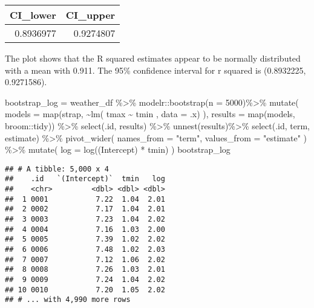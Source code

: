 \documentclass[
]{article}
\newenvironment{Shaded}{\begin{snugshade}}{\end{snugshade}}
\newcommand{\AttributeTok}[1]{\textcolor[rgb]{0.77,0.63,0.00}{#1}}
\newcommand{\DecValTok}[1]{\textcolor[rgb]{0.00,0.00,0.81}{#1}}
\newcommand{\FunctionTok}[1]{\textcolor[rgb]{0.00,0.00,0.00}{#1}}
\newcommand{\NormalTok}[1]{#1}
\newcommand{\OtherTok}[1]{\textcolor[rgb]{0.56,0.35,0.01}{#1}}
\newcommand{\SpecialCharTok}[1]{\textcolor[rgb]{0.00,0.00,0.00}{#1}}
\newcommand{\StringTok}[1]{\textcolor[rgb]{0.31,0.60,0.02}{#1}}
\begin{document}
\begin{longtable}[]{@{}rr@{}}
\toprule
CI\_lower & CI\_upper \\
\midrule
\endhead
0.8936977 & 0.9274807 \\
\bottomrule
\end{longtable}

The plot shows that the R squared estimates appear to be normally
distributed with a mean with 0.911. The 95\% confidence interval for r
squared is (0.8932225, 0.9271586).

\begin{Shaded}
\begin{Highlighting}[]
\NormalTok{bootstrap\_log }\OtherTok{=}
\NormalTok{  weather\_df }\SpecialCharTok{\%\textgreater{}\%} 
\NormalTok{  modelr}\SpecialCharTok{::}\FunctionTok{bootstrap}\NormalTok{(}\AttributeTok{n =} \DecValTok{5000}\NormalTok{)}\SpecialCharTok{\%\textgreater{}\%} 
  \FunctionTok{mutate}\NormalTok{(}
    \AttributeTok{models =} \FunctionTok{map}\NormalTok{(strap, }\SpecialCharTok{\textasciitilde{}}\FunctionTok{lm}\NormalTok{( tmax }\SpecialCharTok{\textasciitilde{}}\NormalTok{ tmin , }\AttributeTok{data =}\NormalTok{ .x) ),}
    \AttributeTok{results =} \FunctionTok{map}\NormalTok{(models, broom}\SpecialCharTok{::}\NormalTok{tidy)) }\SpecialCharTok{\%\textgreater{}\%} 
  \FunctionTok{select}\NormalTok{(.id, results) }\SpecialCharTok{\%\textgreater{}\%} 
  \FunctionTok{unnest}\NormalTok{(results)}\SpecialCharTok{\%\textgreater{}\%} 
  \FunctionTok{select}\NormalTok{(.id, term, estimate) }\SpecialCharTok{\%\textgreater{}\%} 
  \FunctionTok{pivot\_wider}\NormalTok{(}
    \AttributeTok{names\_from =} \StringTok{"term"}\NormalTok{,}
    \AttributeTok{values\_from =} \StringTok{"estimate"}
\NormalTok{  ) }\SpecialCharTok{\%\textgreater{}\%} 
  \FunctionTok{mutate}\NormalTok{(}
    \AttributeTok{log =} \FunctionTok{log}\NormalTok{(}\StringTok{\textasciigrave{}}\AttributeTok{(Intercept)}\StringTok{\textasciigrave{}} \SpecialCharTok{*}\NormalTok{ tmin)}
\NormalTok{  ) }
\NormalTok{bootstrap\_log}
\end{Highlighting}
\end{Shaded}

\begin{verbatim}
## # A tibble: 5,000 x 4
##    .id   `(Intercept)`  tmin   log
##    <chr>         <dbl> <dbl> <dbl>
##  1 0001           7.22  1.04  2.01
##  2 0002           7.17  1.04  2.01
##  3 0003           7.23  1.04  2.02
##  4 0004           7.16  1.03  2.00
##  5 0005           7.39  1.02  2.02
##  6 0006           7.48  1.02  2.03
##  7 0007           7.12  1.06  2.02
##  8 0008           7.26  1.03  2.01
##  9 0009           7.24  1.04  2.02
## 10 0010           7.20  1.05  2.02
## # ... with 4,990 more rows
\end{verbatim}
\end{document}
